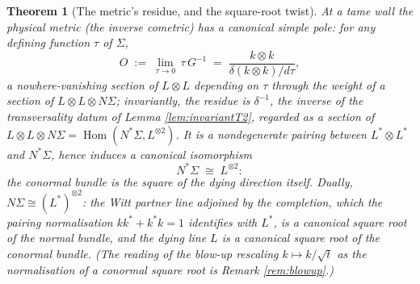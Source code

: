 \documentclass[11pt]{article}
\newtheorem{theorem}{Theorem}[section]
\theoremstyle{definition}
\newcommand{\shL}{L}
\newcommand{\Sig}{\Sigma}
\begin{document}
\begin{theorem}[The metric's residue, and the square-root twist]\label{thm:residue}
At a tame wall the physical metric (the inverse cometric) has a canonical simple pole: for any defining function $\tau$ of $\Sig$,
\[
O \;:=\; \lim_{\tau \to 0}\, \tau\, G^{-1} \;=\; \frac{k \otimes k}{\delta(k \otimes k)/d\tau} ,
\]
a nowhere-vanishing section of $\shL \otimes \shL$ depending on $\tau$ through the weight of a section of $\shL \otimes \shL \otimes N\Sig$; invariantly, the residue is $\delta^{-1}$, the inverse of the transversality datum of Lemma \ref{lem:invariantT2}, regarded as a section of $\shL \otimes \shL \otimes N\Sig = \operatorname{Hom}(N^*\Sig, \shL^{\otimes 2})$. It is a nondegenerate pairing between $\shL^* \otimes \shL^*$ and $N^*\Sig$, hence induces a canonical isomorphism
\[
N^*\Sig \;\cong\; \shL^{\otimes 2} :
\]
the conormal bundle is the square of the dying direction itself. Dually, $N\Sig \cong (\shL^*)^{\otimes 2}$: the Witt partner line adjoined by the completion, which the pairing normalisation $kk^* + k^*k = 1$ identifies with $\shL^*$, is a canonical square root of the \emph{normal} bundle, and the dying line $\shL$ is a canonical square root of the conormal bundle. (The reading of the blow-up rescaling $k \mapsto k/\sqrt{t}$ as the normalisation of a conormal square root is Remark \ref{rem:blowup}.)
\end{theorem}
\end{document}

